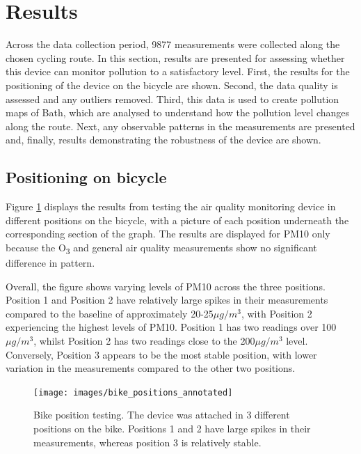 \documentclass[11pt,twosided,a4paper]{report}
\begin{document}
\section{Results} \label{results:q1}

Across the data collection period, \num{9877} measurements were collected along the chosen cycling route. In this section, results are presented for assessing whether this device can monitor pollution to a satisfactory level. First, the results for the positioning of the device on the bicycle are shown. Second, the data quality is assessed and any outliers removed. Third, this data is used to create pollution maps of Bath, which are analysed to understand how the pollution level changes along the route. Next, any observable patterns in the measurements are presented and, finally, results demonstrating the robustness of the device are shown.

\subsection{Positioning on bicycle}

Figure \ref{fig:bike_positions_pm10} displays the results from testing the air quality monitoring device in different positions on the bicycle, with a picture of each position underneath the corresponding section of the graph. The results are displayed for PM10 only because the O\textsubscript{3} and general air quality measurements show no significant difference in pattern.

Overall, the figure shows varying levels of PM10 across the three positions. Position 1 and Position 2 have relatively large spikes in their measurements compared to the baseline of approximately 20-25$\mu g/m^3$, with Position 2 experiencing the highest levels of PM10. Position 1 has two readings over 100$\mu g/m^3$, whilst Position 2 has two readings close to the 200$\mu g/m^3$ level. Conversely, Position 3 appears to be the most stable position, with lower variation in the measurements compared to the other two positions. 

\begin{figure}[!tb]
\centering
\texttt{[image: images/bike\_positions\_annotated]}
\caption[Bike position testing.]{Bike position testing. The device was attached in 3 different positions on the bike. Positions 1 and 2 have large spikes in their measurements, whereas position 3 is relatively stable.}
\label{fig:bike_positions_pm10}
\end{figure}
\end{document}

